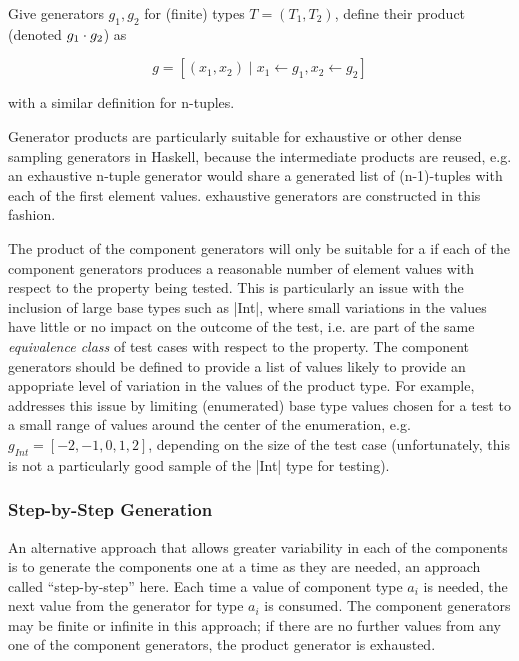 \begin{df}
Give generators $g_1,g_2$ for (finite) types $T = (T_1, T_2)$, 
define their product (denoted $g_1 \cdot g_2$) as

$$ g = [ (x_1, x_2) \mid x _1 \leftarrow g_1, x_2 \leftarrow g_2 ] $$

with a similar definition for n-tuples.
\end{df}

\noindent
Generator products are particularly suitable for 
exhaustive or other dense sampling generators in Haskell,
because the intermediate products are reused,
e.g. an exhaustive n-tuple generator would
share a generated list of (n-1)-tuples with 
each of the first element values.
\SC exhaustive generators are constructed in this fashion.

The product of the component generators will only be suitable for a \pbt
if each of the component generators produces a reasonable number of element values
with respect to the property being tested.
This is particularly an issue with the inclusion of large base types such as |Int|,
where small variations in the values have little or no impact on the outcome of the test,
i.e. are part of the same \emph{equivalence class} of test cases with respect to the property.
The component generators should be defined to provide a list of values
likely to provide an appopriate level of variation in the values of the product type.
For example, \SC addresses this issue by limiting (enumerated) base type values chosen for a test
to a small range of values around the center of the enumeration,
e.g. $g_{Int} = [-2,-1,0,1,2] $, depending on the size of the test case
(unfortunately, this is not a particularly good sample of the |Int| type for testing).

\subsubsection{Step-by-Step Generation}

An alternative approach that allows greater variability in each of the components
is to generate the components one at a time as they are needed,
an approach called ``step-by-step'' here.
Each time a value of component type $a_i$ is needed,
the next value from the generator for type $a_i$ is consumed.
The component generators may be finite or infinite in this approach;
if there are no further values from any one of the component generators,
the product generator is exhausted.

